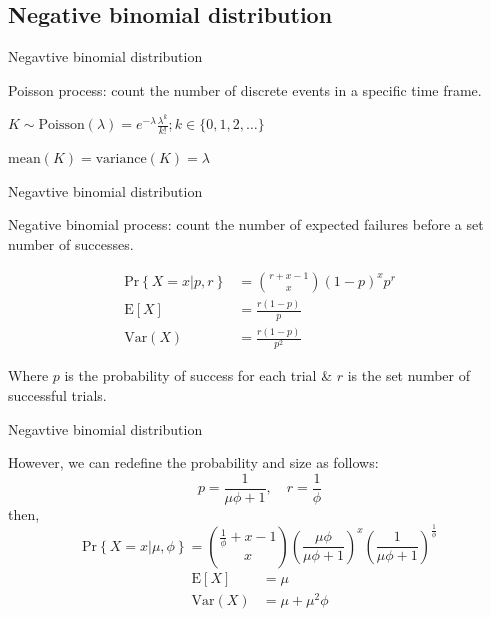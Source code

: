 \documentclass[
  10pt,
  ignorenonframetext,
  m]{beamer}
\begin{document}
\hypertarget{negative-binomial-distribution}{%
\subsection{Negative binomial
distribution}\label{negative-binomial-distribution}}

\begin{frame}{Negavtive binomial distribution}
\protect\hypertarget{negavtive-binomial-distribution}{}

Poisson process: count the number of discrete events in a specific time
frame.

\bigskip
\centering
\large

\(K \sim \text{Poisson}(\lambda) = e^{-\lambda}\frac{\lambda^k}{k!}; k \in \{0, 1, 2, \dots\}\)

\bigskip

\textcolor{uncblue}{$\text{mean}(K) = \text{variance}(K) = \lambda$}

\end{frame}

\begin{frame}{Negavtive binomial distribution}
\protect\hypertarget{negavtive-binomial-distribution-1}{}

Negative binomial process: count the number of expected failures before
a set number of successes.

\begin{align*}
  \text{Pr}\left\{X = x \rvert p, r\right\} & = {r + x - 1 \choose x}(1 - p)^xp^r \\ 
  \text{E}[X] & = \frac{r(1 - p)}{p} \\
  \text{Var}(X) & = \frac{r(1-p)}{p^2}
\end{align*}

Where \(p\) is the probability of success for each trial \& \(r\) is the
set number of successful trials.

\end{frame}

\begin{frame}{Negavtive binomial distribution}
\protect\hypertarget{negavtive-binomial-distribution-2}{}

However, we can redefine the probability and size as follows: \[
p = \frac{1}{\mu\phi + 1}, \quad r = \frac{1}{\phi}
\] then, \[
\text{Pr}\left\{X = x \rvert \mu, \phi\right\} = {\frac{1}{\phi} + x - 1 \choose x}\left(\frac{\mu\phi}{\mu\phi + 1}\right)^x\left(\frac{1}{\mu\phi + 1}\right)^{\frac{1}{\phi}}
\] \textcolor{uncblue}{
\begin{align*}
\text{E}[X] & = \mu \\
\text{Var}(X) & = \mu + \mu^2\phi
\end{align*}
}

\end{frame}
\end{document}

